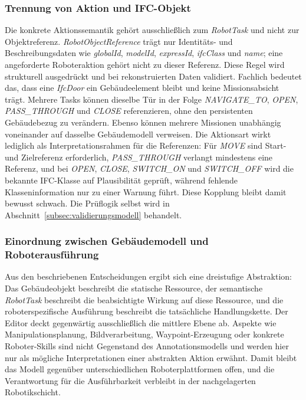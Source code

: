 \subsubsection{Trennung von Aktion und IFC-Objekt}
Die konkrete Aktionssemantik gehört ausschließlich zum \textit{RobotTask} und nicht zur Objektreferenz.
\textit{RobotObjectReference} trägt nur Identitäts- und Beschreibungsdaten wie \textit{globalId}, \textit{modelId},
\textit{expressId}, \textit{ifcClass} und \textit{name}; eine angeforderte Roboteraktion gehört nicht
zu dieser Referenz. Diese Regel wird strukturell ausgedrückt und bei rekonstruierten Daten validiert.
Fachlich bedeutet das, dass eine \textit{IfcDoor} ein Gebäudeelement bleibt und keine
Missionsabsicht trägt. Mehrere Tasks können dieselbe Tür in der Folge \textit{NAVIGATE\_TO},
\textit{OPEN}, \textit{PASS\_THROUGH} und \textit{CLOSE} referenzieren, ohne den persistenten
Gebäudebezug zu verändern.
Ebenso können mehrere Missionen unabhängig voneinander auf dasselbe Gebäudemodell verweisen. Die
Aktionsart wirkt lediglich als Interpretationsrahmen für die Referenzen: Für \textit{MOVE} sind Start- und
Zielreferenz erforderlich, \textit{PASS\_THROUGH} verlangt mindestens eine Referenz, und bei \textit{OPEN},
\textit{CLOSE}, \textit{SWITCH\_ON} und \textit{SWITCH\_OFF} wird die bekannte IFC-Klasse auf Plausibilität geprüft,
während fehlende Klasseninformation nur zu einer Warnung führt. Diese Kopplung bleibt damit bewusst
schwach. Die Prüflogik selbst wird in Abschnitt~\ref{subsec:validierungsmodell} behandelt.
\subsubsection{Einordnung zwischen Gebäudemodell und Roboterausführung}
Aus den beschriebenen Entscheidungen ergibt sich eine dreistufige Abstraktion: Das Gebäudeobjekt
beschreibt die statische Ressource, der semantische \textit{RobotTask} beschreibt die beabsichtigte Wirkung
auf diese Ressource, und die roboterspezifische Ausführung beschreibt die tatsächliche
Handlungskette. Der Editor deckt gegenwärtig ausschließlich die mittlere Ebene ab. Aspekte wie
Manipulationsplanung, Bildverarbeitung, Waypoint-Erzeugung oder konkrete Roboter-Skills sind nicht
Gegenstand des Annotationsmodells und werden hier nur als mögliche Interpretationen einer abstrakten
Aktion erwähnt. Damit bleibt das Modell gegenüber unterschiedlichen Roboterplattformen offen, und
die Verantwortung für die Ausführbarkeit verbleibt in der nachgelagerten Robotikschicht.

